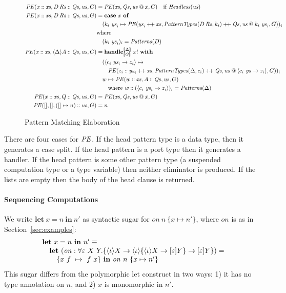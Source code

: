 \documentclass[11pt]{article}
\makeatletter
\newcommand{\sem}[1]{\llbracket{#1}\rrbracket}
\newcommand{\bstack}{\begin{array}[t]{@{}l@{}}}
\newcommand{\estack}{\end{array}}
\newcommand{\key}[1]{\textbf{#1}} %
\newcommand{\var}{\mathit}        %
\newcommand{\handleSymbol}{\rightarrow}
\newcommand{\handle}[2]{{#1} \handleSymbol {#2}}
\newcommand{\thunk}[1]{\{{#1}\}}
\newcommand{\adj}{\Delta}
\newcommand{\evd}{\varepsilon}
\newcommand{\effin}[1]{\langle {#1} \rangle}
\newcommand{\effout}[1]{[{#1}]}
\newcommand{\id}{\iota}
\makeatother
\begin{document}
\begin{figure*}
\small
\begin{align*}
\PE(x \cons \xs, D\,\Rs \cons \Qs, \us, G) &=
    \PE(\xs, \Qs, \us \proj x, G)  \quad \text{if } \hdless(\us)\\
\PE(x \cons \xs, D\,\Rs \cons \Qs, \us, G) &=
    \key{case}~x~\key{of}\\
    & \quad
      (k_i~\ys_i \mapsto
      \PE(\ys_i \concat \xs, \PatternTypes(D\,\Rs, k_i) \concat \Qs, \us \proj k_i~\ys_i, G))_i\\
    & \text{where} \\
    & \quad (k_i~\ys_i)_i = \Patterns(D) \\
\PE(x \cons \xs, \effin{\adj}A \cons \Qs, \us, G) &=
    \key{handle}^{\sem{\adj}}_{\sem{G}}~x!~\key{with} \\
    & \quad
      (\effin{\handle{c_i~\ys_i}{z_i}} \mapsto \\
         & \quad \quad \PE(z_i \cons \ys_i \concat \xs, \PatternTypes(\adj, c_i) \concat \Qs, \us \proj \effin{\handle{c_i~\ys}{z_i}}, G))_i \\
    & \quad  w \mapsto \PE(w \cons \xs, A \cons \Qs, \us, G) \,\\
    & \quad\quad \text{where}\,\, w \cons (\effin{\handle{c_i~\ys_i}{z_i}})_i = \Patterns(\adj) \\
\PE(x \cons \xs, Q \cons \Qs, \us, G) &= \PE(\xs, \Qs, \us \proj x, G) \\
\PE(\emptylist, \emptylist, (\emptylist \mapsto n) \cons \us, G) &= n \\
\end{align*}
\caption{Pattern Matching Elaboration}
\label{fig:pattern-matching-elaboration-2}
\end{figure*}
%
There are four cases for $\mathit{PE}$. If the head pattern type is a data type,
then it generates a case split. If the head pattern is a port type
then it generates a handler. If the head pattern is some other pattern
type (a suspended computation type or a type variable) then neither
eliminator is produced. If the lists are empty then the body of the
head clause is returned.

\paragraph{Sequencing Computations}
We write $\key{let}~x=n~\key{in}~n'$ as syntactic sugar for
$\var{on}~n~\thunk{x \mapsto n'}$, where $\var{on}$ is as in
Section~\ref{sec:examples}:
%
\[
\bstack
\key{let}~x=n~\key{in}~n' \equiv \\
\quad \key{let}~
  (\var{on} :
    \forall \evd~X~Y.
       \thunk{\effin{\id}X \to \effin{\id}\thunk{\effin{\id}X \to \effout{\evd}Y} \to \effout{\evd}Y}) = \\
  \qquad \thunk{x~f~\mapsto~f~x}~\key{in}~\var{on}~n~\thunk{x \mapsto n'}
\estack
\]
This sugar differs from the polymorphic let construct in two ways: 1)
it has no type annotation on $n$, and 2) $x$ is monomorphic in $n'$.
\medskip
\end{document}
